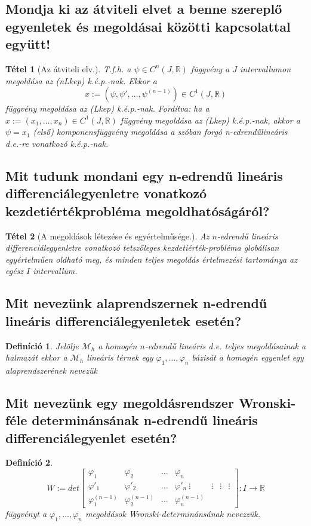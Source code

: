 \documentclass[12pt,a4paper]{article}
\newcommand{\R}{\mathbb{R}}
\newcommand{\CM}{\mathcal{M}}
\newcommand{\f}{\varphi}
\newcommand{\bb}[1]{\left( #1 \right)}
\newtheorem{tet}{Tétel}[section]
\newtheorem{defi}{Definíció}[section]
\begin{document}
\subsection{Mondja ki az átviteli elvet a benne szereplő egyenletek és megoldásai közötti kapcsolattal együtt!}
\begin{tet}[Az átviteli elv.]
T.f.h. a $\psi \in C^n(J,\R)$ függvény a $J$ intervallumon megoldása az (nLkep) k.é.p.-nak. Ekkor a
\[
x := (\psi,\psi',\ldots,\psi^{(n-1)}) \in C^1(J,\R)
\]
függvény megoldása az (Lkep) k.é.p.-nak.
Fordítva: ha a $x := \bb{x_1,\ldots,x_n}\in C^1(J,\R)$ függvény megoldása az (Lkep) k.é.p.-nak, akkor a $\psi = x_1$ (első) komponensfüggvény megoldása a szóban forgó n-edrendűlineáris d.e.-re vonatkozó k.é.p.-nak.
\end{tet}

\subsection{Mit tudunk mondani egy n-edrendű lineáris differenciálegyenletre vonatkozó kezdetiértékprobléma megoldhatóságáról?}
\begin{tet}[A megoldások létezése és egyértelműsége.]
Az $n$-edrendű lineáris differenciálegyenletre vonatkozó tetszőleges kezdetiérték-probléma globálisan egyértelműen oldható meg, és minden teljes megoldás értelmezési tartománya az egész $I$ intervallum.
\end{tet}

\subsection{Mit nevezünk alaprendszernek n-edrendű lineáris differenciálegyenletek esetén?}
\begin{defi}
Jelölje $\CM_h$ a homogén $n$-edrendű lineáris d.e. teljes megoldásainak a halmazát ekkor a $\CM_h$ lineáris térnek egy $\f_1, \ldots , \f_n$ bázisát a homogén egyenlet egy
alaprendszerének nevezük
\end{defi}

\subsection{Mit nevezünk egy megoldásrendszer Wronski-féle determinánsának n-edrendű lineáris differenciálegyenlet esetén?}
\begin{defi}
\[
W:= det\begin{bmatrix}
\f_1 & \f_2 & \ldots & \f_n \\
\f'_1 & \f'_2 & \ldots & \f'_n \
\vdots & \vdots & \vdots & \vdots \\
\f^{(n-1)}_1 & \f^{(n-1)}_2 & \ldots  & \f^{(n-1)}_n
\end{bmatrix} : I \to \R
\]
függvényt a $\f_1, \ldots , \f_n$ megoldások Wronski-determinánsának nevezzük.
\end{defi}
\end{document}
